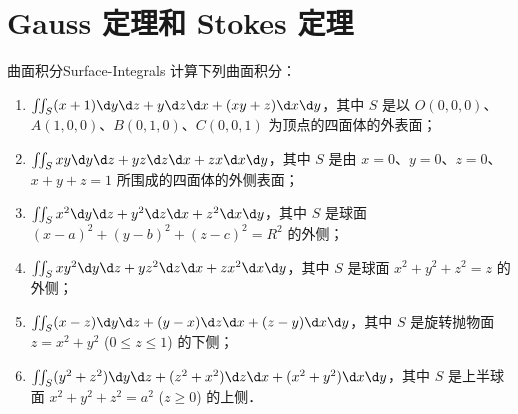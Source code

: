 \section{Gauss 定理和 Stokes 定理}

\begin{problem}{曲面积分}{Surface-Integrals}
    计算下列曲面积分：
    \begin{enumerate}
        \item $\iint_S (x+1) \d y \d z + y \d z \d x + (xy + z) \d x \d y$，其中 $S$ 是以 $O(0,0,0)$、$A(1,0,0)$、$B(0,1,0)$、$C(0,0,1)$ 为顶点的四面体的外表面；
        \item $\iint_S xy \d y \d z + yz \d z \d x + zx \d x \d y$，其中 $S$ 是由 $x=0$、$y=0$、$z=0$、$x+y+z=1$ 所围成的四面体的外侧表面；
        \item $\iint_S x^2 \d y \d z + y^2 \d z \d x + z^2 \d x \d y$，其中 $S$ 是球面 $(x-a)^2 + (y-b)^2 + (z-c)^2 = R^2$ 的外侧；
        \item $\iint_S xy^2 \d y \d z + yz^2 \d z \d x + zx^2 \d x \d y$，其中 $S$ 是球面 $x^2 + y^2 + z^2 = z$ 的外侧；
        \item $\iint_S (x-z) \d y \d z + (y-x) \d z \d x + (z-y) \d x \d y$，其中 $S$ 是旋转抛物面 $z = x^2 + y^2$ ($0 \le z \le 1$) 的下侧；
        \item $\iint_S (y^2+z^2) \d y \d z + (z^2+x^2) \d z \d x + (x^2+y^2) \d x \d y$，其中 $S$ 是上半球面 $x^2 + y^2 + z^2 = a^2$ ($z \ge 0$) 的上侧．
    \end{enumerate}
\end{problem}

